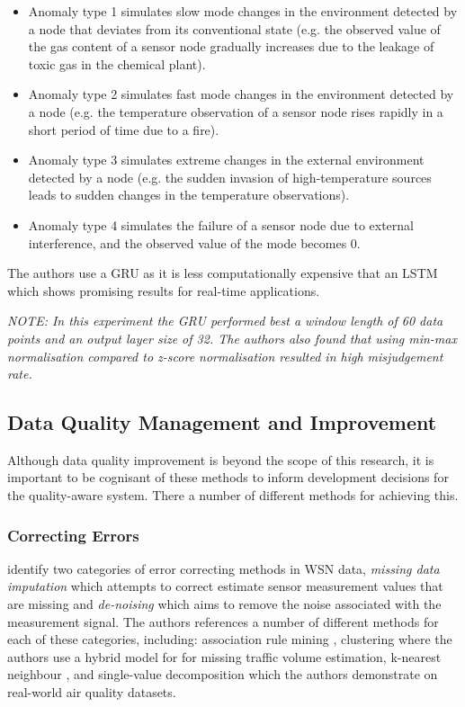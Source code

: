 \begin{itemize}
    \item Anomaly type 1 simulates slow mode changes in the environment detected by a node that deviates from its conventional state (e.g. the observed value of the gas content of a sensor node gradually increases due to the leakage of toxic gas in the chemical plant).
    \item Anomaly type 2 simulates fast mode changes in the environment detected by a node (e.g. the temperature observation of a sensor node rises rapidly in a short period of time due to a fire).
    \item Anomaly type 3 simulates extreme changes in the external environment detected by a node (e.g. the sudden invasion of high-temperature sources leads to sudden changes in the temperature observations).
    \item Anomaly type 4 simulates the failure of a sensor node due to external interference, and the observed value of the mode becomes 0.
\end{itemize}

The authors use a GRU as it is less computationally expensive that an LSTM which shows promising results for real-time applications.

    {\color{secondary-text-color} \textit{NOTE: In this experiment the GRU performed best a window length of 60 data points and an output layer size of 32. The authors also found that using min-max normalisation compared to z-score normalisation resulted in high misjudgement rate.}}

\subsection{Data Quality Management and Improvement}\label{ssec:data_quality_management}

Although data quality improvement is beyond the scope of this research, it is important to be cognisant of these methods to  inform development decisions for the quality-aware system. There a number of different methods for achieving this.

\subsubsection{Correcting Errors}

\cite{tehSensorDataQuality2020} identify two categories of error correcting methods in WSN data, \textit{missing data imputation} which attempts to correct estimate sensor measurement values that are missing and \textit {de-noising} which aims to remove the noise associated with the measurement signal. The authors references a number of different methods for each of these categories, including: association rule mining \citep{gruenwaldUsingDataMining2007}, clustering \citep{tangHybridApproachIntegrate2015} where the authors use a hybrid model for for missing traffic volume estimation, k-nearest neighbour \citep{liNearestNeighborImputation2014}, and single-value decomposition \citep{xuInterpolatingMissingValues2017} which the authors demonstrate on real-world air quality datasets.

